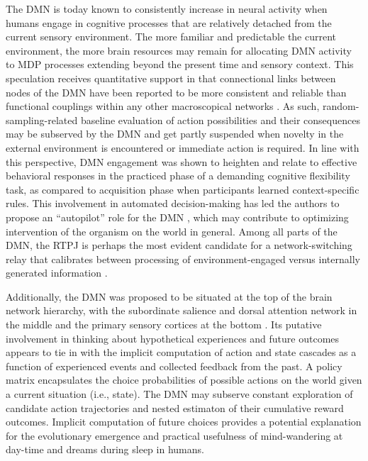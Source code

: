 \documentclass[10pt,letterpaper]{article}
\begin{document}
The DMN is today known to consistently increase in neural
activity when humans engage in cognitive processes that are relatively detached from
the current sensory environment.
The more familiar and predictable the current environment, the more brain resources may remain for allocating DMN activity to MDP processes extending beyond the present time and sensory context.
%
This speculation receives quantitative support in that connectional links between
nodes of the DMN have been reported to be more consistent and reliable than
functional couplings within any other macroscopical networks \citep{shehz2009}.
As such, random-sampling-related baseline evaluation of action possibilities and
their consequences may be subserved by the DMN and get partly suspended when novelty in
the external environment is encountered or immediate action is required.
%
In line with this perspective, DMN engagement was shown to heighten and relate to effective behavioral responses in the practiced phase of a demanding cognitive flexibility task, as compared to acquisition phase when participants learned context-specific rules. This involvement in automated decision-making has led the authors to propose an ``autopilot'' role for the DMN \citep{vatansever2017pnas}, which may contribute to optimizing intervention of the organism on the world in general. Among all parts of the DMN, the RTPJ is perhaps the most evident candidate for a network-switching relay that calibrates between processing of environment-engaged versus internally generated information \citep{downar2000multimodal, golland2006extrinsic, bzdok2013tpj}.


Additionally,
the DMN was proposed to be situated
at the top of the brain network hierarchy, with
the subordinate salience and dorsal attention network in the middle and
the primary sensory cortices at the bottom
\citep{carhart2010default, margulies2016situating}.
Its putative involvement in thinking about 
hypothetical experiences and future outcomes
appears to tie in with the implicit computation of
action and state cascades as a function of
experienced events and collected feedback from the past.
A policy matrix encapsulates the choice probabilities of possible actions
on the world given a current situation (i.e., state).
The DMN may subserve
  constant exploration of candidate action trajectories and
  nested estimaton of their
  cumulative reward outcomes. Implicit computation of future choices
  provides a potential explanation for the
  evolutionary emergence and practical usefulness of
  mind-wandering at day-time and dreams during sleep
  in humans.
\end{document}

